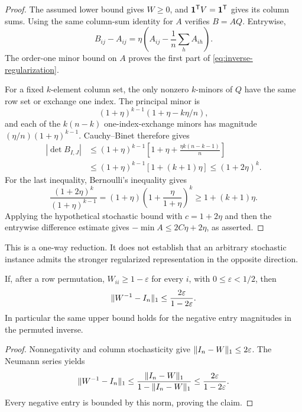 \begin{proof}
The assumed lower bound gives $W\geq0$, and
$\mathbf 1^{\mathsf T}V=\mathbf 1^{\mathsf T}$ gives its column sums.
Using the same column-sum identity for $A$ verifies $B=AQ$.
Entrywise,
\[
 B_{ij}-A_{ij}
 =\eta\left(A_{ij}-\frac1n\sum_h A_{ih}\right).
\]
The order-one minor bound on $A$ proves the first part of
\eqref{eq:inverse-regularization}.

For a fixed $k$-element column set, the only nonzero $k$-minors
of $Q$ have the same row set or exchange one index.  The principal
minor is
\[
 (1+\eta)^{k-1}(1+\eta-k\eta/n),
\]
and each of the $k(n-k)$ one-index-exchange minors has magnitude
$(\eta/n)(1+\eta)^{k-1}$.  Cauchy--Binet therefore gives
\begin{align*}
 |\det B_{I,J}|&\leq
 (1+\eta)^{k-1}
 \left[1+\eta+\frac{\eta k(n-k-1)}n\right]\\
 &\leq(1+\eta)^{k-1}[1+(k+1)\eta]
 \leq(1+2\eta)^k.
\end{align*}
For the last inequality, Bernoulli's inequality gives
\[
 \frac{(1+2\eta)^k}{(1+\eta)^{k-1}}
 =(1+\eta)\left(1+\frac\eta{1+\eta}\right)^k
 \geq1+(k+1)\eta.
\]
Applying the hypothetical stochastic bound with $c=1+2\eta$
and then the entrywise difference estimate gives
$-\min A\leq2C\eta+2\eta$, as asserted.
\end{proof}

This is a one-way reduction.  It does not establish that an
arbitrary stochastic instance admits the stronger regularized
representation in the opposite direction.

\begin{lemma}
\label{lem:inverse-dominant-matching}
If, after a row permutation, $W_{ii}\geq1-\varepsilon$ for every
$i$, with $0\leq\varepsilon<1/2$, then
\begin{equation}
 \|W^{-1}-I_n\|_1\leq
 \frac{2\varepsilon}{1-2\varepsilon}.
 \label{eq:inverse-dominant-matching}
\end{equation}
In particular the same upper bound holds for the negative entry
magnitudes in the permuted inverse.
\end{lemma}

\begin{proof}
Nonnegativity and column stochasticity give
$\|I_n-W\|_1\leq2\varepsilon$.  The Neumann series yields
\[
 \|W^{-1}-I_n\|_1
 \leq\frac{\|I_n-W\|_1}{1-\|I_n-W\|_1}
 \leq\frac{2\varepsilon}{1-2\varepsilon}.
\]
Every negative entry is bounded by this norm, proving the claim.
\end{proof}

